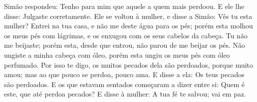 {  Simão respondeu: Tenho para mim que aquele a quem mais perdoou. E ele lhe disse: Julgaste corretamente.
  Ele se voltou à mulher, e disse a Simão: Vês tu esta mulher? Entrei na tua casa, e não me deste água para os pés; porém esta molhou os meus pés com lágrimas, e os enxugou com os seus cabelos da cabeça.
  Tu não me beijaste; porém esta, desde que entrou, não parou de me beijar os pés.
  Não ungiste a minha cabeça com óleo, porém esta ungiu os meus pés com óleo perfumado.
  Por isso te digo, os muitos pecados dela são perdoados, porque muito amou; mas ao que pouco se perdoa, pouco ama.
  E disse a ela: Os teus pecados são perdoados.
  E os que estavam sentados começaram a dizer entre si: Quem é este, que até perdoa pecados?
  E disse à mulher: A tua fé te salvou; vai em paz.
\par }

